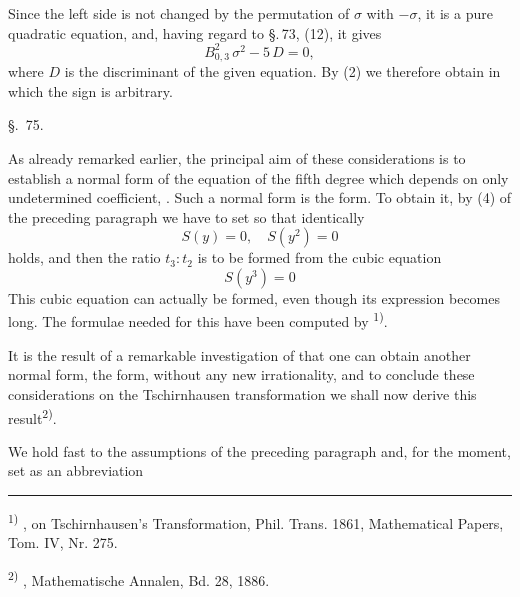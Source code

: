 
Since the left side is not changed by the permutation of $\sigma$ with $-\sigma$, it is a pure quadratic equation, and, having regard to \S.\,73, (12), it gives
\[
B_{0,3}^2\,\sigma^2 - 5\,D = 0,
\]
where $D$ is the discriminant of the given equation. By (2) we therefore obtain
in which the sign is arbitrary.

\begin{center}
\S.\ 75.

\end{center}

As already remarked earlier, the principal aim of these considerations is to establish a normal form of the equation of the fifth degree which depends on only  undetermined coefficient, . Such a normal form is the  form. To obtain it, by (4) of the preceding paragraph we have to set
so that identically
\[
S(y) = 0, \quad S(y^2) = 0
\]
holds, and then the ratio $t_3 : t_2$ is to be formed from the cubic equation
\[
S(y^3) = 0
\]
This cubic equation can actually be formed, even though its expression becomes long. The formulae needed for this have been computed by \textsuperscript{1)}.

It is the result of a remarkable investigation of  that one can obtain another normal form, the  form, without any new irrationality, and to conclude these considerations on the Tschirnhausen transformation we shall now derive this result\textsuperscript{2)}.

We hold fast to the assumptions of the preceding paragraph and, for the moment, set as an abbreviation

\bigskip
\noindent\rule{4cm}{0.4pt}

\noindent\textsuperscript{1)} , on Tschirnhausen's Transformation, Phil. Trans. 1861, Mathematical Papers, Tom. IV, Nr. 275.

\noindent\textsuperscript{2)} , Mathematische Annalen, Bd. 28, 1886.
